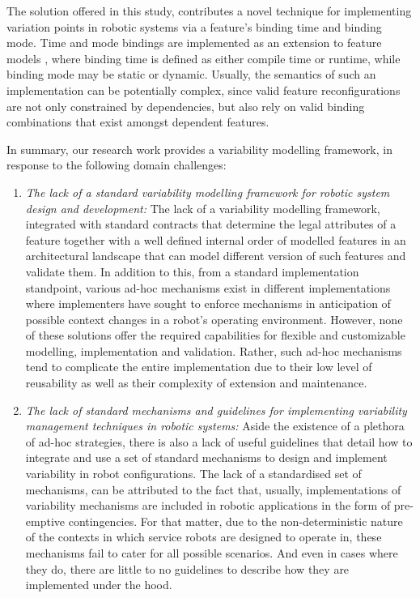 \documentclass[conference]{IEEEtran}
\begin{document}
The solution offered in this study, contributes a novel technique for implementing variation points in robotic systems via a feature's binding time and binding mode. Time and mode bindings are implemented as an extension to feature models \cite{flex-feat-bind}, where binding time is defined as either compile time or runtime, while binding mode may be static or dynamic. Usually, the semantics of such an implementation can be potentially complex, since valid feature reconfigurations are not only constrained by dependencies, but also rely on valid binding combinations that exist amongst dependent features.

In summary, our research work provides a variability modelling framework, in response to the following domain challenges:
\begin{enumerate}
    \item \textit{The lack of a standard variability modelling framework for robotic system design and development: }The lack of a variability modelling framework, integrated with standard contracts that determine the legal attributes of a feature together with a well defined internal order of modelled features in an architectural landscape that can model different version of such features and validate them. In addition to this, from a standard implementation standpoint, various ad-hoc mechanisms exist in different implementations where implementers have sought to enforce mechanisms in anticipation of possible context changes in a robot's operating environment. However, none of these solutions offer the required capabilities for flexible and customizable modelling, implementation and validation. Rather, such ad-hoc mechanisms tend to complicate the entire implementation due to their low level of reusability as well as their complexity of extension and maintenance.
    
    \item \textit{The lack of standard mechanisms and guidelines for implementing variability management techniques in robotic systems:} Aside the existence of a plethora of ad-hoc strategies, there is also a lack of useful guidelines that detail how to integrate and use a set of standard mechanisms to design and implement variability in robot configurations. The lack of a standardised set of mechanisms, can be attributed to the fact that, usually, implementations of variability mechanisms are included in robotic applications in the form of pre-emptive contingencies. For that matter, due to the non-deterministic nature of the contexts in which service robots are designed to operate in, these mechanisms fail to cater for all possible scenarios. And even in cases where they do, there are little to no guidelines to describe how they are implemented under the hood.
    

\end{enumerate}
\end{document}
